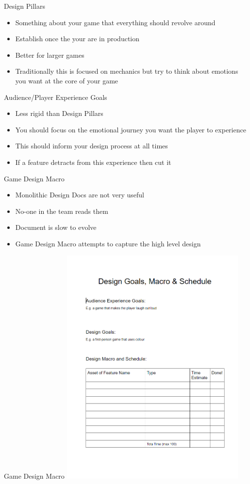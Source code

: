 \begin{frame}{Design Pillars}
	\begin{itemize}
		\item Something about your game that everything should revolve around
		\item Establish once the your are in production
		\item Better for larger games
		\item Traditionally this is focused on mechanics but try to think about emotions you want at the core of your game
	\end{itemize}
\end{frame}

\begin{frame}{Audience/Player Experience Goals}
	\begin{itemize}
		\item Less rigid than Design Pillars
		\item You should focus on the emotional journey you want the player to experience
		\item This should inform your design process at all times
		\item If a feature detracts from this experience then cut it
	\end{itemize}
\end{frame}

\begin{frame}{Game Design Macro}
	\begin{itemize}
		\item Monolithic Design Docs are not very useful
		\item No-one in the team reads them
		\item Document is slow to evolve
		\item Game Design Macro attempts to capture the high level design 
	\end{itemize}
\end{frame}

\begin{frame}{Game Design Macro}
\includegraphics[width=0.7\textwidth,height=0.7\textheight]{game_design_macro}
\end{frame}

